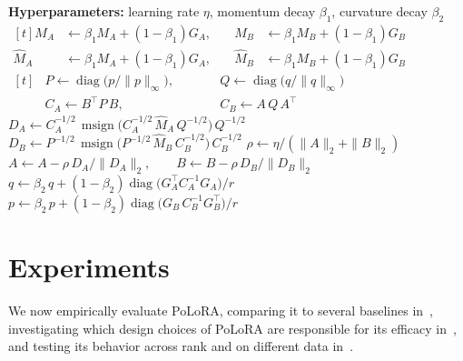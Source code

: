 \documentclass[11pt]{article}
\DeclareMathOperator{\diag}{diag}
\DeclareMathOperator{\msign}{msign}
\newcommand{\norm}[1]{\| #1\|}
\newcommand{\methodname}{PoLoRA\xspace}
\theoremstyle{plain}
\theoremstyle{definition}
\theoremstyle{remark}
\theoremstyle{definition}
\begin{document}
\begin{algorithm}[t]
\caption{\methodname{} step for one LoRA pair $(A,B)$}
\label{alg:ours}
\begin{algorithmic}[1]
\Statex \textbf{Hyperparameters:} learning rate $\eta$, momentum decay $\beta_1$, curvature decay $\beta_2$
\Statex
{}
\State $\begin{aligned}[t]
  M_A &\gets \beta_1 M_A+(1-\beta_1)G_A, &\quad M_B &\gets \beta_1 M_B+(1-\beta_1)G_B\\[-4pt]
  \widehat M_A &\gets \beta_1 M_A+(1-\beta_1)G_A, &\quad \widehat M_B &\gets \beta_1 M_B+(1-\beta_1)G_B
\end{aligned}$  \label{ln:mom}
\Statex
{}
\State $\begin{aligned}[t]
  &P \gets \diag\!\big(p/\norm{p}_\infty\big), &&\qquad Q \gets \diag\!\big(q/\norm{q}_\infty\big)\\[-4pt]
  &C_A \gets B^\top P\, B, &&\qquad C_B \gets A\,Q\, A^\top
\end{aligned}$  \label{ln:pqnorm}
\State $D_A\gets C_A^{-1/2}\,\msign\big(C_A^{-1/2}\,\widehat M_A\,Q^{-1/2}\big)\,Q^{-1/2}$  \label{ln:Aspectral}
\State $D_B\gets P^{-1/2}\,\msign\big(P^{-1/2}\,\widehat M_B\,C_B^{-1/2}\big)\,C_B^{-1/2}$  \label{ln:Bspectral}
\Statex
{}
\State $\rho\gets\eta/(\norm{A}_2+\norm{B}_2)$  \label{ln:rho}
\State $A\gets A-\rho\,D_A/\norm{D_A}_2, \qquad B\gets B-\rho\,D_B/\norm{D_B}_2$ \label{ln:spectralnormupdate}
\Statex
{}
\State $q\gets\beta_2\, q+(1-\beta_2)\diag\big(G_A^\top C_A^{-1} G_A\big)/r$   \label{ln:qmom}
\State $p\gets\beta_2\, p+(1-\beta_2)\diag\big(G_B\, C_B^{-1} G_B^\top\big)/r$  \label{ln:pmom}
\end{algorithmic}
\end{algorithm}
\section{Experiments}
\label{sec:exp}

We now empirically evaluate \methodname{}, comparing it to several baselines in~, investigating which design choices of \methodname{} are responsible for its efficacy in~, and testing its behavior across rank and on different data in~.
\end{document}
